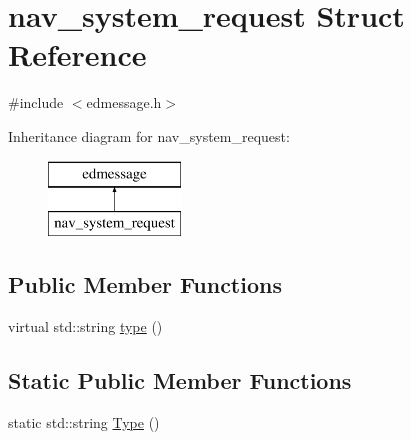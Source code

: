 \hypertarget{structnav__system__request}{\section{nav\-\_\-system\-\_\-request Struct Reference}
\label{structnav__system__request}
}


{\ttfamily \#include $<$edmessage.\-h$>$}

Inheritance diagram for nav\-\_\-system\-\_\-request\-:\begin{figure}[H]
\begin{center}
\leavevmode
\includegraphics[height=2.000000cm]{structnav__system__request}
\end{center}
\end{figure}
\subsection*{Public Member Functions}
\begin{DoxyCompactItemize}
\item 
virtual std\-::string \hyperlink{structnav__system__request_aea068f2cdc3e36680b870c0acdfdd111}{type} ()
\end{DoxyCompactItemize}
\subsection*{Static Public Member Functions}
\begin{DoxyCompactItemize}
\item 
static std\-::string \hyperlink{structnav__system__request_a97cb1df7141c49f62ee8c244af217823}{Type} ()
\end{DoxyCompactItemize}
